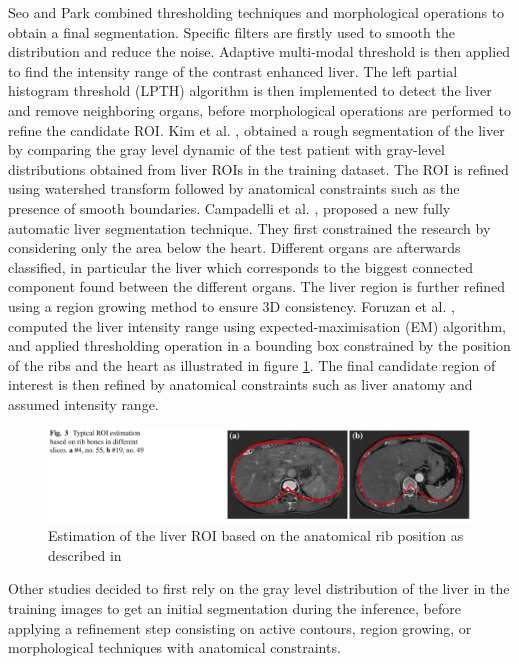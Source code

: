 \documentclass[]{article}
\begin{document}
Seo and Park \cite{Seo2005} 
combined thresholding techniques and morphological operations to obtain
a final segmentation. Specific filters are firstly used to smooth the
distribution and reduce the noise. Adaptive multi-modal threshold is
then applied to find the intensity range of the contrast enhanced liver.
The left partial histogram threshold (LPTH) algorithm is then
implemented to detect the liver and remove neighboring organs, before
morphological operations are performed to refine the candidate ROI.
Kim et al. \cite{Kim2007}, obtained a rough segmentation of the liver by comparing the gray
level dynamic of the test patient with gray-level distributions obtained
from liver ROIs in the training dataset. The ROI is refined using
watershed transform followed by anatomical constraints such as the
presence of smooth boundaries.
Campadelli et al. \cite{Campadelli2009}, proposed a new fully automatic liver segmentation
technique. They first constrained the research by considering only the
area below the heart. Different organs are afterwards classified, in
particular the liver which corresponds to the biggest connected
component found between the different organs. The liver region is
further refined using a region growing method to ensure 3D consistency.
Foruzan et al. \cite{Foruzan2009}, computed the liver intensity range using
expected-maximisation (EM) algorithm, and applied thresholding operation
in a bounding box constrained by the position of the ribs and the heart
as illustrated in figure \ref{ForuzanFig3}. The final candidate region of interest is then
refined by anatomical constraints such as liver anatomy and assumed
intensity range.

\begin{figure} [ht!]
	\centering
	\label{ForuzanFig3}
	\includegraphics[width=0.7\linewidth]{images/image1}
	\caption{Estimation of the liver ROI based on the anatomical rib position as described in \cite{Foruzan2009}}
\end{figure}


Other studies decided to first rely on the gray level distribution of
the liver in the training images to get an initial segmentation during
the inference, before applying a refinement step consisting on active
contours, region growing, or morphological techniques with anatomical
constraints.
\end{document}
